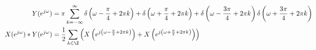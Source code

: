 \documentclass{article}
\begin{document}
\subsection{}

\begin{align}
    Y(e^{j \omega}) &= \pi \sum_{k = -\infty}^\infty \delta\left(\omega - \frac{\pi}{4} + 2\pi k\right) + \delta\left(\omega + \frac{\pi}{4} + 2\pi k\right) + \delta\left(\omega - \frac{3\pi}{4} + 2\pi k\right) \delta\left(\omega + \frac{3\pi}{4} + 2\pi k\right) \\
    X(e^{j \omega}) \ast Y(e^{j \omega}) &= \frac{1}{2} \sum_{k \in \Z} \left(X\left(e^{j \left(\omega - \frac{\pi}{2} + 2\pi k\right)}\right) + X\left(e^{j \left(\omega + \frac{\pi}{2} + 2\pi k\right)}\right)\right)
\end{align}
\begin{center}
\end{center}

\subsection{}
\end{document}
